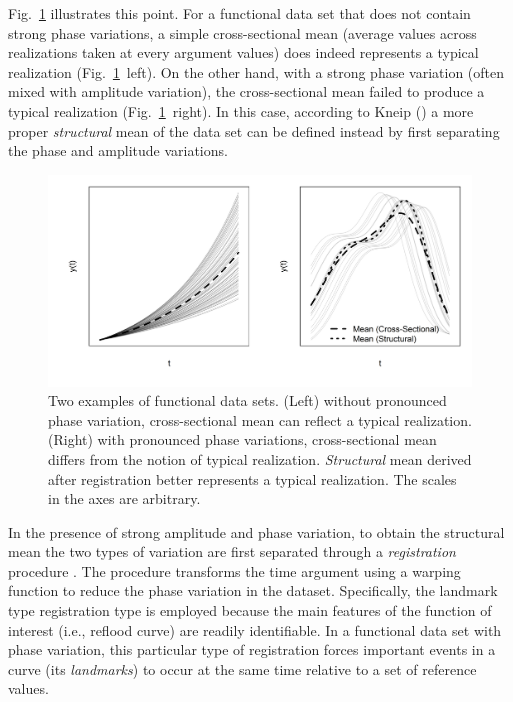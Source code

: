 Fig.~\ref{fig:illustrate_phase_variation} illustrates this point.
For a functional data set that does not contain strong phase variations, 
a simple cross-sectional mean (average values across realizations taken at every argument values) does indeed represents a typical realization (Fig.~\ref{fig:illustrate_phase_variation}~left).
On the other hand, with a strong phase variation (often mixed with amplitude variation), 
the cross-sectional mean failed to produce a typical realization (Fig.~\ref{fig:illustrate_phase_variation}~right).
In this case, according to Kneip (\cite{Kneip1992}) a more proper \emph{structural} mean of the data set can be defined instead by first separating the phase and amplitude variations.
\begin{figure}[bth]
	\centering
	\includegraphics[scale=0.48,trim={0 1cm 0 0},clip]{../figures/r-figures/illustratePhaseVariation.png}
	\caption[Variation in functional data sets, with and without phase variation]{Two examples of functional data sets. (Left) without pronounced phase variation, cross-sectional mean can reflect a typical realization. (Right) with pronounced phase variations, cross-sectional mean differs from the notion of typical realization. \emph{Structural} mean derived after registration better represents a typical realization. The scales in the axes are arbitrary.}
	\label{fig:illustrate_phase_variation}
\end{figure}

In the presence of strong amplitude and phase variation, to obtain the structural mean the two types of variation are first separated through a \emph{registration} procedure \cite{Wang1997,Ramsay1998}.
The procedure transforms the time argument using a warping function to reduce the phase variation in the dataset.
Specifically, the landmark type registration type is employed because the main features of the function of interest (i.e., reflood curve) are readily identifiable.
In a functional data set with phase variation, this particular type of registration forces important events in a curve (its \emph{landmarks}) to occur at the same time relative to a set of reference values.

